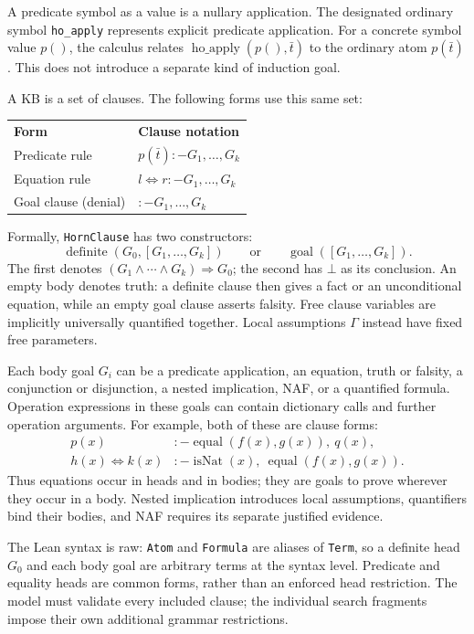 \documentclass[11pt]{article}
\begin{document}
A predicate symbol as a value is a nullary application. The designated ordinary
symbol \texttt{ho\_apply} represents explicit predicate application. For a
concrete symbol value $p()$, the calculus relates
$\operatorname{ho\_apply}(p(),\bar t)$ to the ordinary atom $p(\bar t)$.
This does not introduce a separate kind of induction goal.

A KB is a set of clauses. The following forms use this same set:
\begin{center}
\begin{tabular}{ll}
\textbf{Form} & \textbf{Clause notation} \\
Predicate rule & $p(\bar t)\mathbin{:-}G_1,\ldots,G_k$ \\
Equation rule & $l\mathrel{\Leftrightarrow}r\mathbin{:-}G_1,\ldots,G_k$ \\
Goal clause (denial) & $\mathbin{:-}G_1,\ldots,G_k$
\end{tabular}
\end{center}
Formally, \texttt{HornClause} has two constructors:
\[
 \operatorname{definite}(G_0,[G_1,\ldots,G_k])
 \qquad\text{or}\qquad
 \operatorname{goal}([G_1,\ldots,G_k]).
\]
The first denotes $(G_1\land\cdots\land G_k)\Rightarrow G_0$; the second has
$\bot$ as its conclusion. An empty body denotes truth: a definite clause then
gives a fact or an unconditional equation, while an empty goal clause asserts
falsity. Free clause variables are implicitly universally quantified together.
Local assumptions $\Gamma$ instead have fixed free parameters.

Each body goal $G_i$ can be a predicate application, an equation, truth or falsity,
a conjunction or disjunction, a nested implication, NAF, or a quantified formula.
Operation expressions in these goals can contain dictionary calls and further
operation arguments. For example, both of these are clause forms:
\[
\begin{aligned}
 p(x)&\mathbin{:-}\operatorname{equal}(f(x),g(x)),\ q(x),\\
 h(x)\mathrel{\Leftrightarrow}k(x)
      &\mathbin{:-}\operatorname{isNat}(x),\ \operatorname{equal}(f(x),g(x)).
\end{aligned}
\]
Thus equations occur in heads and in bodies; they are goals to prove wherever
they occur in a body. Nested implication introduces local assumptions, quantifiers
bind their bodies, and NAF requires its separate justified evidence.

The Lean syntax is raw: \texttt{Atom} and \texttt{Formula} are aliases of
\texttt{Term}, so a definite head $G_0$ and each body goal are arbitrary terms at
the syntax level. Predicate and equality heads are common forms, rather than
an enforced head restriction. The model must validate every included clause;
the individual search fragments impose their own additional grammar restrictions.
\end{document}
